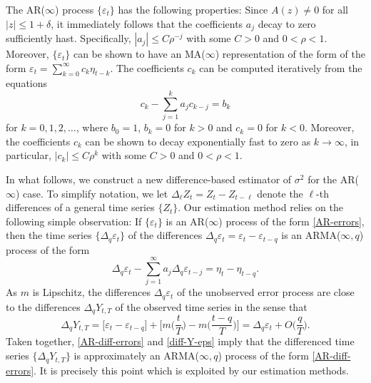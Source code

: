 The AR($\infty$) process $\{\varepsilon_t\}$ has the following properties: Since $A(z) \ne 0$ for all $|z| \le 1 + \delta$, it immediately follows that the coefficients $a_j$ decay to zero sufficiently hast. Specifically, $|a_j| \le C \rho^{-j}$ with some $C > 0$ and $0 < \rho < 1$. Moreover, $\{ \varepsilon_t\}$ can be shown to have an MA($\infty$) representation of the form of the form $\varepsilon_t =  \sum_{k=0}^\infty c_k \eta_{t-k}$. The coefficients $c_k$ can be computed iteratively from the equations 
\begin{equation}\label{c-recursion}
c_k - \sum_{j=1}^k a_j c_{k-j} = b_k 
\end{equation}
for $k = 0,1,2,\ldots$, where $b_0 = 1$, $b_k = 0$ for $k > 0$ and $c_k = 0$ for $ k < 0$. Moreover, the coefficients $c_k$ can be shown to decay exponentially fast to zero as $k \rightarrow \infty$, in particular, $|c_k| \le C \rho^k$ with some $C > 0$ and $0 < \rho < 1$. 


In what follows, we construct a new difference-based estimator of $\sigma^2$ for the AR($\infty$) case. To simplify notation, we let $\Delta_\ell Z_t = Z_t - Z_{t-\ell}$ denote the $\ell$-th differences of a general time series $\{Z_t\}$. Our estimation method relies on the following simple observation: If $\{\varepsilon_t\}$ is an AR($\infty$) process of the form \eqref{AR-errors}, then the time series $\{ \Delta_q \varepsilon_t \}$ of the differences $\Delta_q \varepsilon_t = \varepsilon_t - \varepsilon_{t-q}$ is an ARMA($\infty,q$) process of the form 
\begin{equation}\label{AR-diff-errors} 
\Delta_q \varepsilon_t - \sum_{j=1}^\infty a_j \Delta_q \varepsilon_{t-j} = \eta_t - \eta_{t-q}. 
\end{equation}
As $m$ is Lipschitz, the differences $\Delta_q \varepsilon_t$ of the unobserved error process are close to the differences $\Delta_q Y_{t,T}$ of the observed time series in the sense that 
\begin{equation}\label{diff-Y-eps}
\Delta_q Y_{t,T} = \big[\varepsilon_t  - \varepsilon_{t-q} \big] + \Big[ m \Big(\frac{t}{T}\Big) - m \Big(\frac{t-q}{T}\Big) \Big] = \Delta_q \varepsilon_t + O \Big( \frac{q}{T} \Big).  
\end{equation} 
Taken together, \eqref{AR-diff-errors} and \eqref{diff-Y-eps} imply that the differenced time series $\{ \Delta_q Y_{t,T} \}$ is approximately an ARMA($\infty,q$) process of the form \eqref{AR-diff-errors}. It is precisely this point which is exploited by our estimation methods. 


